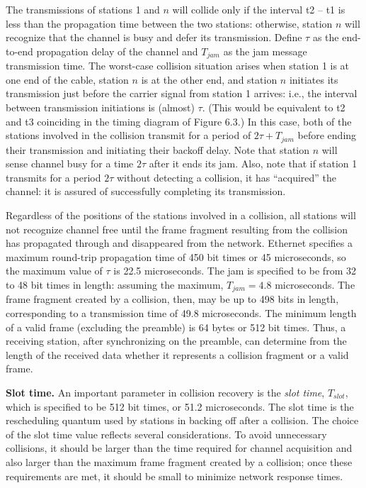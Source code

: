 The transmissions of stations 1 and $n$ will collide only if the interval t2 -- t1 is less than the propagation time between the two stations: otherwise, station $n$ will recognize that the channel is busy and defer its transmission. Define $\tau$ as the end-to-end propagation delay of the channel and $T_{jam}$ as the jam message transmission time. The worst-case collision situation arises when station 1 is at one end of the cable, station $n$ is at the other end, and station $n$ initiates its transmission just before the carrier signal from station 1 arrives: i.e., the interval between transmission initiations is (almost) $\tau$. (This would be equivalent to t2 and t3 coinciding in the timing diagram of Figure 6.3.) In this case, both of the stations involved in the collision transmit for a period of $2\tau+T_{jam}$ before ending their transmission and initiating their backoff delay. Note that station $n$ will sense channel busy for a time $2\tau$ after it ends its jam. Also, note that if station 1 transmits for a period $2\tau$ without detecting a collision, it has ``acquired'' the channel: it is assured of successfully completing its transmission.

Regardless of the positions of the stations involved in a collision, all stations will not recognize channel free until the frame fragment resulting from the collision has propagated through and disappeared from the network. Ethernet specifies a maximum round-trip propagation time of 450 bit times or 45 microseconds, so the maximum value of $\tau$ is 22.5 microseconds. The jam is specified to be from 32 to 48 bit times in length: assuming the maximum, $T_{jam}=4.8$ microseconds. The frame fragment created by a collision, then, may be up to 498 bits in length, corresponding to a transmission time of 49.8 microseconds. The minimum length of a valid frame (excluding the preamble) is 64 bytes or 512 bit times. Thus, a receiving station, after synchronizing on the preamble, can determine from the length of the received data whether it represents a collision fragment or a valid frame.

\noindent\textbf{Slot time.} An important parameter in collision recovery is the \emph{slot time}, $T_{slot}$, which is specified to be 512 bit times, or 51.2 microseconds. The slot time is the rescheduling quantum used by stations in backing off after a collision. The choice of the slot time value reflects several considerations. To avoid unnecessary collisions, it should be larger than the time required for channel acquisition and also larger than the maximum frame fragment created by a collision; once these requirements are met, it should be small to minimize network response times.

